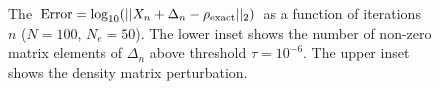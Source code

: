 \documentclass[prl,aps,twocolumn,showpacs,twocolumngrid,superbib]{revtex4}
\begin{document}
\begin{figure}[t]
\caption{\small  The 
${\rm Error} = \log_{10}(||X_n + \Delta_n - \rho_{\rm exact}||_2)$
as a function of iterations $n$ ($N = 100$, $N_e = 50$). The lower 
inset shows the number of non-zero matrix elements of $\Delta_n$ 
above threshold $\tau = 10^{-6}$.  The upper inset shows the density matrix
perturbation.
\label{DX}}
\end{figure}
\end{document}
